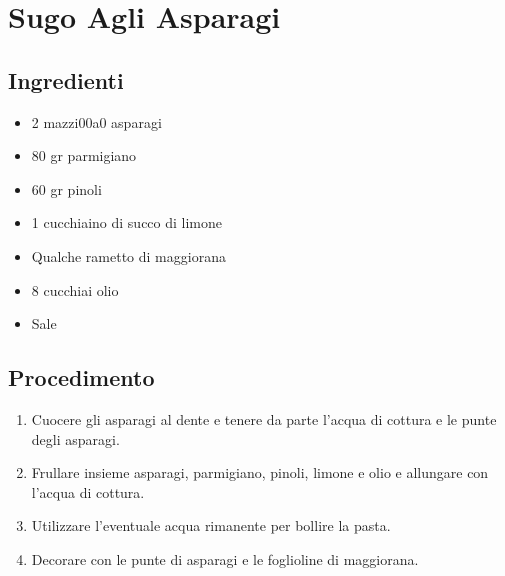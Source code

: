 \section{Sugo Agli Asparagi}
\subsection{Ingredienti}
\begin{itemize}
\item 2 mazzi00a0 asparagi  
\item 80 gr parmigiano   
\item 60 gr pinoli  
\item 1 cucchiaino di succo di limone  
\item Qualche rametto di maggiorana  
\item 8 cucchiai olio   
\item Sale
\end{itemize}
\subsection{Procedimento}
\begin{enumerate}
\item  Cuocere gli asparagi al dente e tenere da parte l'acqua di cottura e le punte degli asparagi.  
\item  Frullare insieme asparagi, parmigiano, pinoli, limone e olio e allungare con l'acqua di cottura.  
\item  Utilizzare l'eventuale acqua rimanente per bollire la pasta.   
\item  Decorare con le punte di asparagi e le foglioline di maggiorana.
\end{enumerate}

